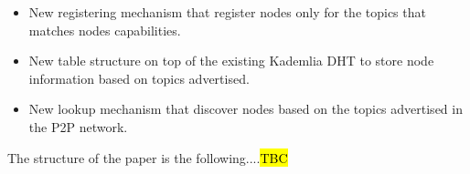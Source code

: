 \begin{itemize}
 \item New registering mechanism that register nodes only for the topics that matches nodes capabilities.
 \item New table structure on top of the existing Kademlia DHT to store node information based on topics advertised.
 \item New lookup mechanism that discover nodes based on the topics advertised in the P2P network.
\end{itemize}
    
The structure of the paper is the following....\hl{TBC}
